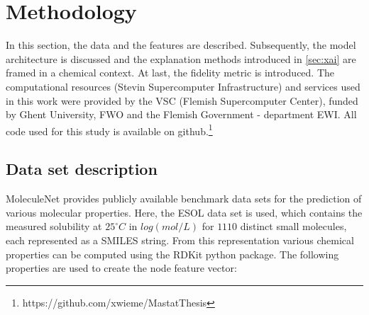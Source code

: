 \chapter{Methodology}


In this section, the data and the features are described. 
Subsequently, the model architecture is discussed and the explanation methods 
introduced in \cref{sec:xai} are framed in a chemical context. At last, 
the fidelity metric is introduced. The computational resources (Stevin Supercomputer 
Infrastructure) and services used in this work were provided by the VSC (Flemish 
Supercomputer Center), funded by Ghent University, FWO and the Flemish Government 
- department EWI. All code used for this study is available on github.\footnote{https://github.com/xwieme/MastatThesis}


\section{Data set description}


MoleculeNet provides publicly available benchmark data sets for the prediction of 
various molecular properties.\cite{wu2018moleculenet} Here, the ESOL data set is used,
which contains the measured solubility at $25^{\circ} C$ in $log(mol/L)$ for $1110$ 
distinct small molecules, each represented as a SMILES string.\cite{delaney2004esol}
From this representation various chemical properties can be computed using the RDKit python package\cite{landrum2010r}. 
The following properties are used to create the node feature vector: \cite{wu2023chemistry}


